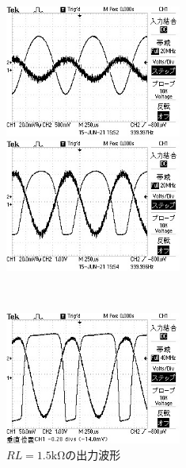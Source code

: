 \documentclass[a4paper,11pt]{jsarticle}
\begin{document}
\begin{figure}[H]
  \begin{center}
    \begin{minipage}{0.48\textwidth}
      \begin{center}
        \includegraphics[clip,width=5.8cm]{picture/1.5K_data/TEK0000.jpeg}
      \end{center}
    \end{minipage}
    \begin{minipage}{0.48\textwidth}
      \begin{center}
        \includegraphics[clip,width=5.8cm]{picture/1.5K_data/TEK0002.jpeg}
      \end{center}
    \end{minipage} \\
    \begin{minipage}{0.48\textwidth}
      \begin{center}
        \includegraphics[clip,width=5.8cm]{picture/1.5K_data/TEK0009.jpeg}
      \end{center}
    \end{minipage}
    \caption{$RL=1.5\si{\kilo \ohm}$の出力波形}
    \label{G:1_5Scope}
  \end{center}
\end{figure}
\end{document}
